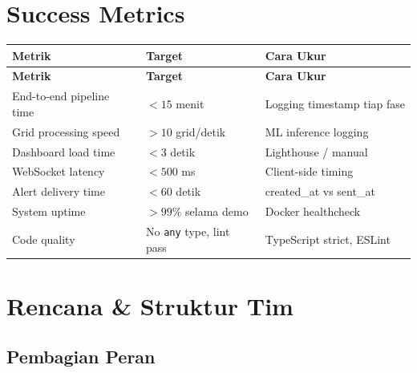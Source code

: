 \documentclass[11pt,a4paper]{article}
\begin{document}
\section{Success Metrics}

\begin{longtable}{p{5cm} p{3cm} p{5cm}}
    \toprule
    \textbf{Metrik} & \textbf{Target} & \textbf{Cara Ukur} \\
    \midrule
    \endfirsthead
    \toprule
    \textbf{Metrik} & \textbf{Target} & \textbf{Cara Ukur} \\
    \midrule
    \endhead
    \hline
    \endfoot
    \bottomrule
    \endlastfoot

    End-to-end pipeline time & $<15$ menit & Logging timestamp tiap fase \\

    Grid processing speed & $>10$ grid/detik & ML inference logging \\

    Dashboard load time & $<3$ detik & Lighthouse / manual \\

    WebSocket latency & $<500$ ms & Client-side timing \\

    Alert delivery time & $<60$ detik & created\_at vs sent\_at \\

    System uptime & $>99\%$ selama demo & Docker healthcheck \\

    Code quality & No \texttt{any} type, lint pass & TypeScript strict, ESLint \\

\end{longtable}

\section{Rencana \& Struktur Tim}

\subsection{Pembagian Peran}
\end{document}
